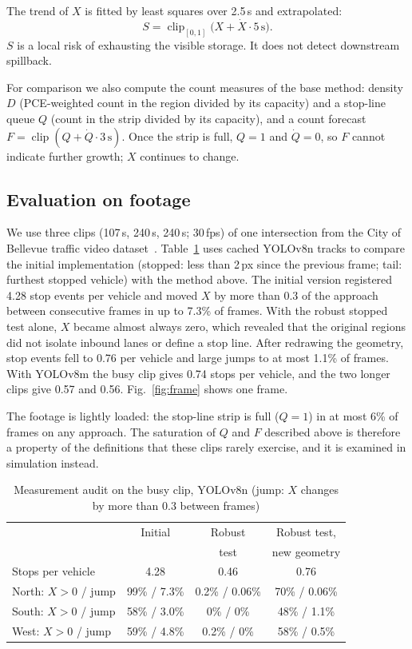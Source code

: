 \documentclass[conference]{IEEEtran}
\begin{document}
The trend of $X$ is fitted by least squares over 2.5\,s and extrapolated:
\begin{equation}
S=\operatorname{clip}_{[0,1]}\bigl(X+\dot X\cdot 5\,\mathrm{s}\bigr).
\end{equation}
$S$ is a local risk of exhausting the visible storage. It does not detect downstream
spillback.

For comparison we also compute the count measures of the base method: density
$D$ (PCE-weighted count in the region divided by its capacity) and a stop-line queue
$Q$ (count in the strip divided by its capacity), and a count forecast
$F=\operatorname{clip}(Q+\dot Q\cdot 3\,\mathrm{s})$. Once the strip is full, $Q=1$ and
$\dot Q=0$, so $F$ cannot indicate further growth; $X$ continues to change.

\subsection{Evaluation on footage}
We use three clips (107\,s, 240\,s, 240\,s; 30\,fps) of one intersection from the City
of Bellevue traffic video dataset~\cite{bellevue}. Table~\ref{tab:measure} uses cached YOLOv8n tracks to compare the initial implementation (stopped: less than 2\,px since the previous frame; tail: furthest
stopped vehicle) with the method above. The initial version registered 4.28 stop events
per vehicle and moved $X$ by more than 0.3 of the approach between consecutive frames in
up to 7.3\% of frames. With the robust stopped test alone, $X$ became almost always zero,
which revealed that the original regions did not isolate inbound lanes or define a stop
line. After redrawing the geometry, stop events fell to 0.76 per vehicle and large jumps
to at most 1.1\% of frames. With YOLOv8m the busy clip gives 0.74 stops per vehicle, and the two longer clips give 0.57 and 0.56. Fig.~\ref{fig:frame} shows one frame.

The footage is lightly loaded: the stop-line strip is full ($Q=1$) in at most 6\% of frames
on any approach. The saturation of $Q$ and $F$ described above is therefore a property
of the definitions that these clips rarely exercise, and it is examined in simulation
instead.

\begin{table}[t]
\caption{Measurement audit on the busy clip, YOLOv8n (jump: $X$ changes by more than 0.3 between frames)}
\label{tab:measure}
\centering
\setlength{\tabcolsep}{3pt}
\begin{tabular}{lccc}
\toprule
 & Initial & Robust & Robust test,\\
 &         & test   & new geometry\\
\midrule
Stops per vehicle & 4.28 & 0.46 & 0.76\\
North: $X>0$ / jump & 99\% / 7.3\% & 0.2\% / 0.06\% & 70\% / 0.06\%\\
South: $X>0$ / jump & 58\% / 3.0\% & 0\% / 0\% & 48\% / 1.1\%\\
West: $X>0$ / jump & 59\% / 4.8\% & 0.2\% / 0\% & 58\% / 0.5\%\\
\bottomrule
\end{tabular}
\end{table}
\end{document}
